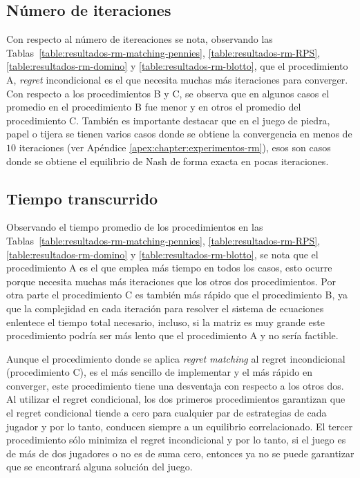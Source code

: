 \subsection{Número de iteraciones}

Con respecto al número de itereaciones se nota, observando las Tablas~\ref{table:resultados-rm-matching-pennies}, \ref{table:resultados-rm-RPS}, \ref{table:resultados-rm-domino} y \ref{table:resultados-rm-blotto}, que el procedimiento A, \textit{regret} incondicional es el que necesita muchas más iteraciones para converger. Con respecto a los procedimientos B y C, se observa que en algunos casos el promedio en el procedimiento B fue menor y en otros el promedio del procedimiento C. También es importante destacar que en el juego de piedra, papel o tijera se tienen varios casos donde se obtiene la convergencia en menos de $10$ iteraciones (ver Apéndice \ref{apex:chapter:experimentos-rm}), esos son casos donde se obtiene el equilibrio de Nash de forma exacta en pocas iteraciones.

\subsection{Tiempo transcurrido}

Observando el tiempo promedio de los procedimientos en las Tablas~\ref{table:resultados-rm-matching-pennies}, \ref{table:resultados-rm-RPS}, \ref{table:resultados-rm-domino} y \ref{table:resultados-rm-blotto}, se nota que el procedimiento A es el que emplea más tiempo en todos los casos, esto ocurre porque necesita muchas más iteraciones que los otros dos procedimientos. Por otra parte el procedimiento C es también más rápido que el procedimiento B, ya que la complejidad en cada iteración para resolver el sistema de ecuaciones enlentece el tiempo total necesario, incluso, si la matriz es muy grande este procedimiento podría ser más lento que el procedimiento A y no sería factible.

Aunque el procedimiento donde se aplica \textit{regret matching} al regret incondicional (procedimiento C), es el más sencillo de implementar y el más rápido en converger, este procedimiento tiene una desventaja con respecto a los otros dos. Al utilizar el regret condicional, los dos primeros procedimientos garantizan que el regret condicional tiende a cero para cualquier par de estrategias de cada jugador y por lo tanto, conducen siempre a un equilibrio correlacionado. El tercer procedimiento sólo minimiza el regret incondicional y por lo tanto, si el juego es de más de dos jugadores o no es de suma cero, entonces ya no se puede garantizar que se encontrará alguna solución del juego.
